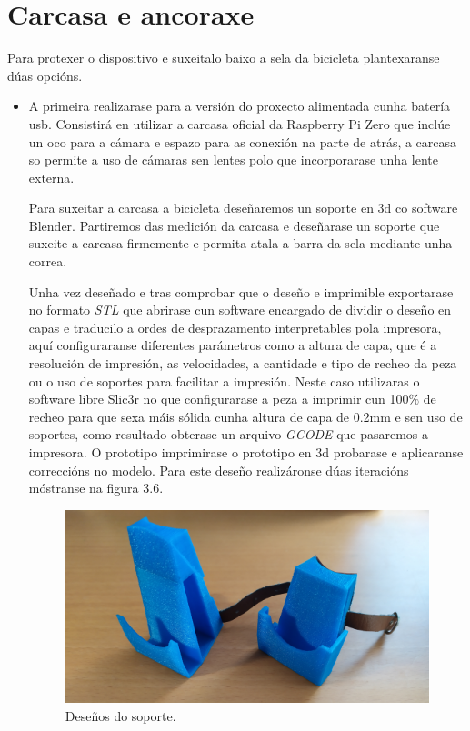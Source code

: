 \section{Carcasa e ancoraxe}

Para protexer o dispositivo e suxeitalo baixo a sela da bicicleta plantexaranse dúas opcións.
\begin{itemize}
    \item A primeira realizarase para a versión do proxecto alimentada cunha batería usb. Consistirá en utilizar a carcasa oficial da Raspberry Pi Zero que inclúe un oco para a cámara e espazo para as conexión na parte de atrás, a carcasa so permite a uso de cámaras sen lentes polo que incorporarase unha lente externa.

    Para suxeitar a carcasa a bicicleta deseñaremos un soporte en 3d co software Blender. Partiremos das medición da carcasa e deseñarase un soporte que suxeite a carcasa firmemente e permita atala a barra da sela mediante unha correa.

    Unha vez deseñado e tras comprobar que o deseño e imprimible exportarase no formato \emph{STL} que abrirase cun software encargado de dividir o deseño en capas e traducilo a ordes de desprazamento interpretables pola impresora, aquí configuraranse diferentes parámetros como a altura de capa, que é a resolución de impresión, as velocidades, a cantidade e tipo de recheo da peza ou o uso de soportes para facilitar a impresión. Neste caso utilizaras o software libre Slic3r no que configurarase a peza a imprimir cun 100\(\%\) de recheo para que sexa máis sólida cunha altura de capa de 0.2mm e sen uso de soportes, como resultado obterase un arquivo \emph{GCODE}  que pasaremos a impresora. O prototipo imprimirase o prototipo en 3d probarase e aplicaranse correccións no modelo. Para este deseño realizáronse dúas iteracións móstranse na figura 3.6.

    \begin{figure}[tb]
      \centering
      \includegraphics[scale=.1]{imaxes/soporte-caixa.jpg}
      \caption{Deseños do soporte.}
      \label{f:soporte caixa}
    \end{figure}



\end{itemize}
